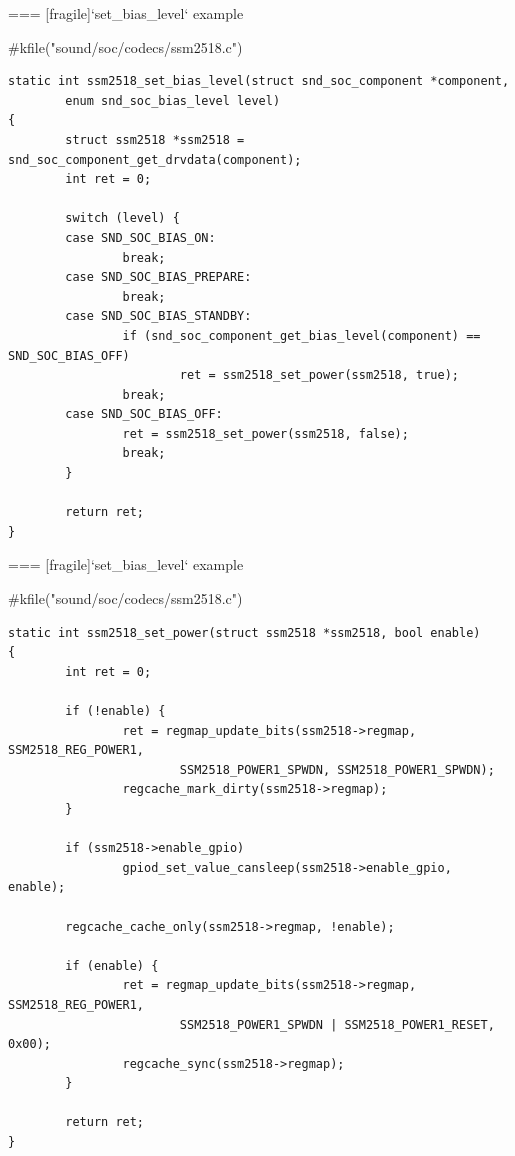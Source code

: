 === [fragile]{`set_bias_level` example}
  \begin{block}{#kfile("sound/soc/codecs/ssm2518.c")}
    \fontsize{8}{8}\selectfont
    \begin{verbatim}
static int ssm2518_set_bias_level(struct snd_soc_component *component,
        enum snd_soc_bias_level level)
{
        struct ssm2518 *ssm2518 = snd_soc_component_get_drvdata(component);
        int ret = 0;

        switch (level) {
        case SND_SOC_BIAS_ON:
                break;
        case SND_SOC_BIAS_PREPARE:
                break;
        case SND_SOC_BIAS_STANDBY:
                if (snd_soc_component_get_bias_level(component) == SND_SOC_BIAS_OFF)
                        ret = ssm2518_set_power(ssm2518, true);
                break;
        case SND_SOC_BIAS_OFF:
                ret = ssm2518_set_power(ssm2518, false);
                break;
        }

        return ret;
}
    \end{verbatim}
  \end{block}


=== [fragile]{`set_bias_level` example}
  \begin{block}{#kfile("sound/soc/codecs/ssm2518.c")}
    \fontsize{8}{8}\selectfont
    \begin{verbatim}
static int ssm2518_set_power(struct ssm2518 *ssm2518, bool enable)
{
        int ret = 0;

        if (!enable) {
                ret = regmap_update_bits(ssm2518->regmap, SSM2518_REG_POWER1,
                        SSM2518_POWER1_SPWDN, SSM2518_POWER1_SPWDN);
                regcache_mark_dirty(ssm2518->regmap);
        }

        if (ssm2518->enable_gpio)
                gpiod_set_value_cansleep(ssm2518->enable_gpio, enable);

        regcache_cache_only(ssm2518->regmap, !enable);

        if (enable) {
                ret = regmap_update_bits(ssm2518->regmap, SSM2518_REG_POWER1,
                        SSM2518_POWER1_SPWDN | SSM2518_POWER1_RESET, 0x00);
                regcache_sync(ssm2518->regmap);
        }

        return ret;
}
    \end{verbatim}
  \end{block}

